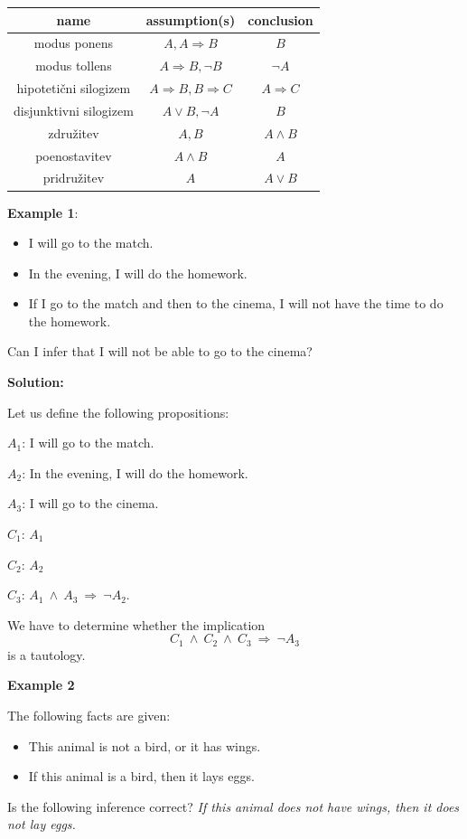 \documentclass[11pt,paper=b5,footinclude,headinclude]{scrbook} %
\def\inn {{~\wedge~}}
\def\sledi {{~\Rightarrow~}}
\theoremstyle{remark}
\theoremstyle{definition} %
\theoremstyle{theorem} %
\begin{document}
\begin{center}
\begin{tabular}{|c|c|c|}
	\hline 
	name & assumption(s) & conclusion\\
	\hline 
	\hline 
	modus ponens & $A,A\Rightarrow B$ & $B$\\
	\hline 
	modus tollens & $A\Rightarrow B,\neg B$ & $\neg A$\\
	\hline 
	hipoteti\v{c}ni silogizem & $A\Rightarrow B,B\Rightarrow C$ & $A\Rightarrow C$\\
	\hline 
	disjunktivni silogizem & $A\vee B,\neg A$ & $B$\\
	\hline 
	združitev  & $A,B$ & $A\wedge B$\\
	\hline 
	poenostavitev & $A\wedge B$ & $A$\\
	\hline 
	pridružitev & $A$ & $A\vee B$\\
	\hline 
\end{tabular}
\end{center}

\textbf{Example 1}:
\begin{itemize}
	\item I will go to the match.
	\item In the evening, I will do the homework.
	\item If I go to the match and then to the cinema, I will not have the time to do the homework.
\end{itemize}
Can I infer that I will not be able to go to the cinema?

\medskip
\textbf{ Solution:}

Let us define the following propositions:

$A_1$: I will go to the match.

$A_2$: In the evening, I will do the homework.

$A_3$: I will go to the cinema.

$C_1$: $A_1$

$C_2$: $A_2$

$C_3$: $A_1\inn A_3\sledi \neg A_2$.

We have to determine whether the implication
$$C_1\inn C_2\inn C_3\sledi \neg A_3$$
is a tautology.

\textbf{Example 2}

The following facts are given:
\begin{itemize}
	\item This animal is not a bird, or it has wings.
	\item If this animal is a bird, then it lays eggs.
\end{itemize}
Is the following inference correct?
{\em If this animal does not have wings, then it does not lay eggs.}
\end{document}
